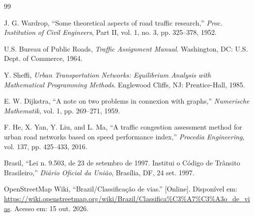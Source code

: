 
\begin{thebibliography}{99}

 J. G. Wardrop, ``Some theoretical aspects of road traffic research,'' \textit{Proc. Institution of Civil Engineers}, Part II, vol. 1, no. 3, pp. 325--378, 1952.

 U.S. Bureau of Public Roads, \textit{Traffic Assignment Manual}. Washington, DC: U.S. Dept. of Commerce, 1964.

 Y. Sheffi, \textit{Urban Transportation Networks: Equilibrium Analysis with Mathematical Programming Methods}. Englewood Cliffs, NJ: Prentice-Hall, 1985.

 E. W. Dijkstra, ``A note on two problems in connexion with graphs,'' \textit{Numerische Mathematik}, vol. 1, pp. 269--271, 1959.

 F. He, X. Yan, Y. Liu, and L. Ma, ``A traffic congestion assessment method for urban road networks based on speed performance index,'' \textit{Procedia Engineering}, vol. 137, pp. 425--433, 2016.

 Brasil, ``Lei n.\textordmasculine{} 9.503, de 23 de setembro de 1997. Institui o Código de Trânsito Brasileiro,'' \textit{Diário Oficial da União}, Brasília, DF, 24 set. 1997.

 OpenStreetMap Wiki, ``Brazil/Classificação de vias.'' [Online]. Disponível em: \url{https://wiki.openstreetmap.org/wiki/Brazil/Classifica%C3%A7%C3%A3o_de_vias}. Acesso em: 15 out. 2026.


\end{thebibliography}
